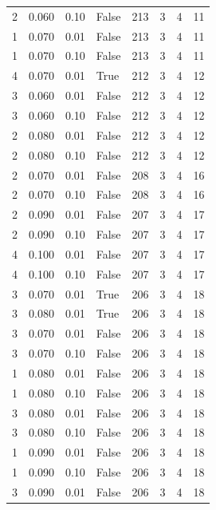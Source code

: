 \documentclass[a4paper,twoside,12pt]{book}
\begin{document}
\begin{table}
\begin{tabular}{rrrlrrrr}
				2 &  0.060 &     0.10 &    False &  213 &  3 &   4 &  11 \\
				1 &  0.070 &     0.01 &    False &  213 &  3 &   4 &  11 \\
				1 &  0.070 &     0.10 &    False &  213 &  3 &   4 &  11 \\
				4 &  0.070 &     0.01 &     True &  212 &  3 &   4 &  12 \\
				3 &  0.060 &     0.01 &    False &  212 &  3 &   4 &  12 \\
				3 &  0.060 &     0.10 &    False &  212 &  3 &   4 &  12 \\
				2 &  0.080 &     0.01 &    False &  212 &  3 &   4 &  12 \\
				2 &  0.080 &     0.10 &    False &  212 &  3 &   4 &  12 \\
				2 &  0.070 &     0.01 &    False &  208 &  3 &   4 &  16 \\
				2 &  0.070 &     0.10 &    False &  208 &  3 &   4 &  16 \\
				2 &  0.090 &     0.01 &    False &  207 &  3 &   4 &  17 \\
				2 &  0.090 &     0.10 &    False &  207 &  3 &   4 &  17 \\
				4 &  0.100 &     0.01 &    False &  207 &  3 &   4 &  17 \\
				4 &  0.100 &     0.10 &    False &  207 &  3 &   4 &  17 \\
				3 &  0.070 &     0.01 &     True &  206 &  3 &   4 &  18 \\
				3 &  0.080 &     0.01 &     True &  206 &  3 &   4 &  18 \\
				3 &  0.070 &     0.01 &    False &  206 &  3 &   4 &  18 \\
				3 &  0.070 &     0.10 &    False &  206 &  3 &   4 &  18 \\
				1 &  0.080 &     0.01 &    False &  206 &  3 &   4 &  18 \\
				1 &  0.080 &     0.10 &    False &  206 &  3 &   4 &  18 \\
				3 &  0.080 &     0.01 &    False &  206 &  3 &   4 &  18 \\
				3 &  0.080 &     0.10 &    False &  206 &  3 &   4 &  18 \\
				1 &  0.090 &     0.01 &    False &  206 &  3 &   4 &  18 \\
				1 &  0.090 &     0.10 &    False &  206 &  3 &   4 &  18 \\
				3 &  0.090 &     0.01 &    False &  206 &  3 &   4 &  18 \\

\end{tabular}
\end{table}
\end{document}
